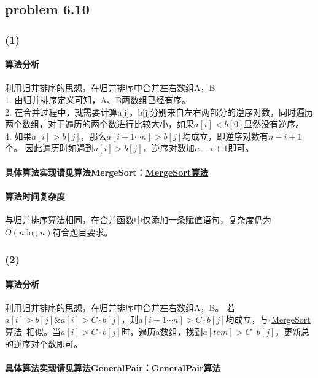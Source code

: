 \documentclass[11pt]{ctexart}
\begin{document}
	\subsection*{problem 6.10}
	\subsubsection*{(1)}
	\paragraph{算法分析}利用归并排序的思想，在归并排序中合并左右数组A，B\\
	\hspace*{20pt}1. 由归并排序定义可知，A、B两数组已经有序。\\
	\hspace*{20pt}2. 在合并过程中，就需要计算a[i]，b[j]分别来自左右两部分的逆序对数，同时遍历两个数组，对于遍历的两个数进行比较大小，如果$a[i]<b[0]$显然没有逆序。\\
	\hspace*{20pt}4. 如果$a[i]>b[j]$，那么$a[i+1\cdots n]>b[j]$均成立，即逆序对数有$n-i+1$个。
	因此遍历时如遇到$a[i]>b[j]$，逆序对数加$n-i+1$即可。
	\paragraph{具体算法实现请见算法MergeSort：\hyperref[MergeSort算法]{MergeSort算法}}
	\paragraph{算法时间复杂度}与归并排序算法相同，在合并函数中仅添加一条赋值语句，复杂度仍为$O(n\log n)$符合题目要求。
	\subsubsection*{(2)}
	\paragraph{算法分析}
	利用归并排序的思想，在归并排序中合并左右数组A，B。
	若$a[i]>b[j]\&a[i]>C\cdot b[j]$，则$a[i+1\cdots n]>C\cdot b[j]$均成立，与 \hyperref[MergeSort算法]{MergeSort算法}\ 相似。当$a[i]>C\cdot b[j]$时，遍历a数组，找到$a[tem]>C\cdot b[j]$，更新总的逆序对个数即可。
	\paragraph{具体算法实现请见算法GeneralPair：\hyperref[GeneralPair算法]{GeneralPair算法}}
\end{document}
